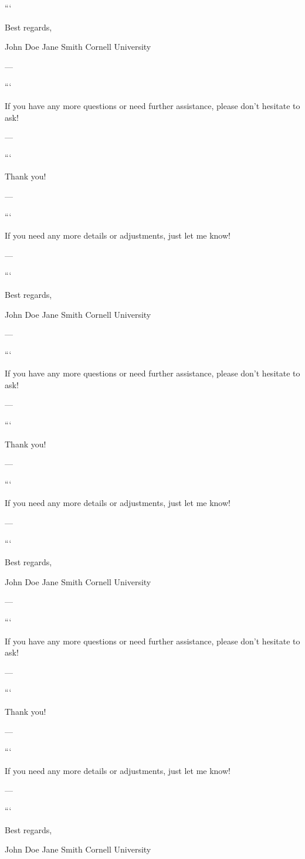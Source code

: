 ``` 

Best regards, 

John Doe  
Jane Smith  
Cornell University  

--- 
 

``` 

If you have any more questions or need further assistance, please don't hesitate to ask! 

--- 
 

``` 

Thank you! 

--- 
 

``` 

If you need any more details or adjustments, just let me know! 

--- 
 

``` 

Best regards, 

John Doe  
Jane Smith  
Cornell University  

--- 
 

``` 

If you have any more questions or need further assistance, please don't hesitate to ask! 

--- 
 

``` 

Thank you! 

--- 
 

``` 

If you need any more details or adjustments, just let me know! 

--- 
 

``` 

Best regards, 

John Doe  
Jane Smith  
Cornell University  

--- 
 

``` 

If you have any more questions or need further assistance, please don't hesitate to ask! 

--- 
 

``` 

Thank you! 

--- 
 

``` 

If you need any more details or adjustments, just let me know! 

--- 
 

``` 

Best regards, 

John Doe  
Jane Smith  
Cornell University  

